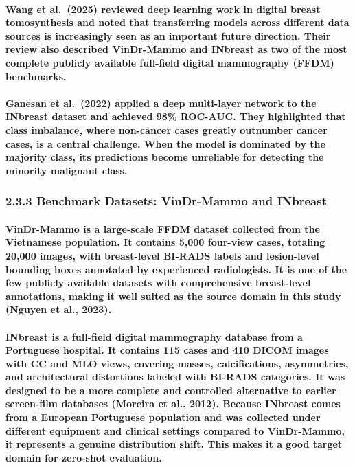 \paragraph{Wang et al. (2025) reviewed deep learning work in digital breast tomosynthesis and noted that transferring models across different data sources is increasingly seen as an important future direction. Their review also described VinDr-Mammo and INbreast as two of the most complete publicly available full-field digital mammography (FFDM) benchmarks.}

\paragraph{Ganesan et al. (2022) applied a deep multi-layer network to the INbreast dataset and achieved 98\% ROC-AUC. They highlighted that class imbalance, where non-cancer cases greatly outnumber cancer cases, is a central challenge. When the model is dominated by the majority class, its predictions become unreliable for detecting the minority malignant class.}

\subsubsection{2.3.3 Benchmark Datasets: VinDr-Mammo and
INbreast}\label{benchmark-datasets-vindr-mammo-and-inbreast}

\paragraph{VinDr-Mammo is a large-scale FFDM dataset collected from the Vietnamese population. It contains 5,000 four-view cases, totaling 20,000 images, with breast-level BI-RADS labels and lesion-level bounding boxes annotated by experienced radiologists. It is one of the few publicly available datasets with comprehensive breast-level annotations, making it well suited as the source domain in this study (Nguyen et al., 2023).}

\paragraph{INbreast is a full-field digital mammography database from a Portuguese hospital. It contains 115 cases and 410 DICOM images with CC and MLO views, covering masses, calcifications, asymmetries, and architectural distortions labeled with BI-RADS categories. It was designed to be a more complete and controlled alternative to earlier screen-film databases (Moreira et al., 2012). Because INbreast comes from a European Portuguese population and was collected under different equipment and clinical settings compared to VinDr-Mammo, it represents a genuine distribution shift. This makes it a good target domain for zero-shot evaluation.}

